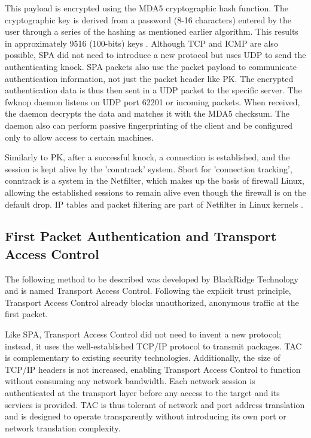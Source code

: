This payload is encrypted using the MDA5 cryptographic hash function.  The cryptographic key is derived from a password (8-16 characters) entered by the user through a series of the hashing as mentioned earlier algorithm.  This results in approximately 9516 (100-bits) keys \cite{jeanquier}.  Although TCP and ICMP are also possible, SPA did not need to introduce a new protocol but uses UDP to send the authenticating knock.  SPA packets also use the packet payload to communicate authentication information, not just the packet header like PK.  The encrypted authentication data is thus then sent in a UDP packet to the specific server.  The fwknop daemon listens on UDP port 62201 or incoming packets.  When received, the daemon decrypts the data and matches it with the MDA5 checksum.  The daemon also can perform passive fingerprinting of the client and be configured only to allow access to certain machines.\\\par

Similarly to PK, after a successful knock, a connection is established, and the session is kept alive by the 'conntrack' system.  Short for 'connection tracking', conntrack is a system in the Netfilter, which makes up the basis of firewall Linux, allowing the established sessions to remain alive even though the firewall is on the default drop.  IP tables and packet filtering are part of Netfilter in Linux kernels \cite{8494695}.\par


\subsection{First Packet Authentication and Transport Access Control}

The following method to be described was developed by BlackRidge Technology and is named Transport Access Control.  Following the explicit trust principle, Transport Access Control already blocks unauthorized, anonymous traffic at the first packet.\\\par

Like SPA, Transport Access Control did not need to invent a new protocol; instead, it uses the well-established TCP/IP protocol to transmit packages.  TAC is complementary to existing security technologies. Additionally, the size of TCP/IP headers is not increased, enabling Transport Access Control to function without consuming any network bandwidth.
Each network session is authenticated at the transport layer before any access to the target and its services is provided. TAC is thus tolerant of network and port address translation and is designed to operate transparently without introducing its own port or network translation complexity. \\\par 

